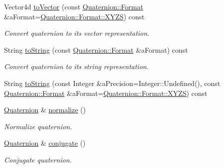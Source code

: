 \begin{DoxyCompactItemize}
Vector4d \hyperlink{classostk_1_1math_1_1geom_1_1d3_1_1trf_1_1rot_1_1_quaternion_af289de332e7a0033ad7989e64566d1a7}{to\+Vector} (const \hyperlink{classostk_1_1math_1_1geom_1_1d3_1_1trf_1_1rot_1_1_quaternion_aa7a75f0dd505a58236ee355959e00bfd}{Quaternion\+::\+Format} \&a\+Format=\hyperlink{classostk_1_1math_1_1geom_1_1d3_1_1trf_1_1rot_1_1_quaternion_aa7a75f0dd505a58236ee355959e00bfda11c51ecd5dc6f86ba3c1ae79e21482f5}{Quaternion\+::\+Format\+::\+X\+Y\+ZS}) const
\begin{DoxyCompactList}\small\item\em Convert quaternion to its vector representation. \end{DoxyCompactList}\item 
String \hyperlink{classostk_1_1math_1_1geom_1_1d3_1_1trf_1_1rot_1_1_quaternion_a9a9e668493a595ce8186602ae0c38dc2}{to\+String} (const \hyperlink{classostk_1_1math_1_1geom_1_1d3_1_1trf_1_1rot_1_1_quaternion_aa7a75f0dd505a58236ee355959e00bfd}{Quaternion\+::\+Format} \&a\+Format) const
\begin{DoxyCompactList}\small\item\em Convert quaternion to its string representation. \end{DoxyCompactList}\item 
String \hyperlink{classostk_1_1math_1_1geom_1_1d3_1_1trf_1_1rot_1_1_quaternion_accad35951a00d56afd5e63d3c55abdd8}{to\+String} (const Integer \&a\+Precision=Integer\+::\+Undefined(), const \hyperlink{classostk_1_1math_1_1geom_1_1d3_1_1trf_1_1rot_1_1_quaternion_aa7a75f0dd505a58236ee355959e00bfd}{Quaternion\+::\+Format} \&a\+Format=\hyperlink{classostk_1_1math_1_1geom_1_1d3_1_1trf_1_1rot_1_1_quaternion_aa7a75f0dd505a58236ee355959e00bfda11c51ecd5dc6f86ba3c1ae79e21482f5}{Quaternion\+::\+Format\+::\+X\+Y\+ZS}) const
\item 
\hyperlink{classostk_1_1math_1_1geom_1_1d3_1_1trf_1_1rot_1_1_quaternion}{Quaternion} \& \hyperlink{classostk_1_1math_1_1geom_1_1d3_1_1trf_1_1rot_1_1_quaternion_a34c1237fb6961ff0dc2b7222a3c146f6}{normalize} ()
\begin{DoxyCompactList}\small\item\em Normalize quaternion. \end{DoxyCompactList}\item 
\hyperlink{classostk_1_1math_1_1geom_1_1d3_1_1trf_1_1rot_1_1_quaternion}{Quaternion} \& \hyperlink{classostk_1_1math_1_1geom_1_1d3_1_1trf_1_1rot_1_1_quaternion_a7d975785f2a7f4cc83d9410e37908b11}{conjugate} ()
\begin{DoxyCompactList}\small\item\em Conjugate quaternion. \end{DoxyCompactList}\item 

\end{DoxyCompactItemize}
